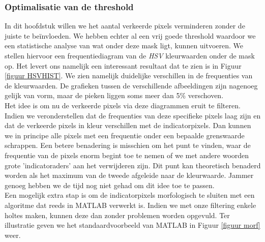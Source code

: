 \documentclass[a4paper,kulak]{kulakarticle}
\begin{document}
\subsubsection{Optimalisatie van de threshold}
In dit hoofdstuk willen we het aantal verkeerde pixels verminderen zonder de juiste te beïnvloeden. We hebben echter al een vrij goede threshold waardoor we een statistische analyse van wat onder deze mask ligt, kunnen uitvoeren. We stellen hiervoor een frequentiediagram van de \textit{HSV} kleurwaarden onder de mask op. Het levert ons namelijk een interessant resultaat dat te zien is in Figuur  \ref{figuur HSVHIST}. We zien namelijk duidelijke verschillen in de frequenties van de kleurwaarden. De grafieken tussen de verschillende afbeeldingen zijn nagenoeg gelijk van vorm, maar de pieken liggen soms meer dan 5\% verschoven.\\
Het idee is om nu de verkeerde pixels via deze diagrammen eruit te filteren. Indien we veronderstellen dat de frequenties van deze specifieke pixels laag zijn en dat de verkeerde pixels in kleur verschillen met de indicatorpixels. Dan kunnen we in principe alle pixels met een frequentie onder een bepaalde grenswaarde schrappen. Een betere benadering is misschien om het punt te vinden, waar de frequentie van de pixels enorm begint toe te nemen of we met andere woorden grote 'indicatoraders' aan het verwijderen zijn. Dit punt kan theoretisch benaderd worden als het maximum van de tweede afgeleide naar de kleurwaarde. Jammer genoeg hebben we de tijd nog niet gehad om dit idee toe te passen. \\
Een mogelijk extra stap is om de indicatorpixels morfologisch te sluiten met een algoritme dat reeds in MATLAB verwerkt is. Indien we met onze filtering enkele holtes maken, kunnen deze dan zonder problemen worden opgevuld. Ter illustratie geven we het standaardvoorbeeld van MATLAB in Figuur \ref{figuur morf} weer.
\end{document}

